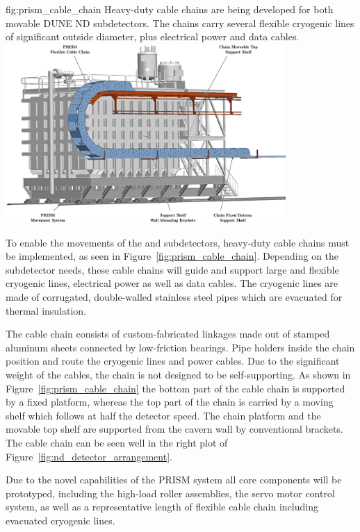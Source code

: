 \begin{dunefigure}{fig:prism_cable_chain}
{Heavy-duty cable chains are being developed for both movable DUNE ND subdetectors. The chains carry several flexible cryogenic lines of significant outside diameter, plus electrical power and data cables.}
\includegraphics[width=0.8\textwidth]{graphics/i-and-i/prism_cable_chain}
\end{dunefigure}

To enable the movements of the  and  subdetectors, heavy-duty cable chains must be implemented, as  seen in Figure~\ref{fig:prism_cable_chain}. Depending on the subdetector needs, these cable chains will guide and support large and flexible cryogenic lines, electrical power as well as data cables. The cryogenic lines are made of corrugated, double-walled stainless steel pipes which are evacuated for thermal insulation.

The cable chain consists of custom-fabricated linkages made out of stamped aluminum sheets connected by low-friction bearings. Pipe holders inside the chain position and route the cryogenic lines and power cables. Due to the significant weight of the cables, the chain is not designed to be self-supporting. As shown in Figure~\ref{fig:prism_cable_chain} the bottom part of the cable chain is supported by a fixed platform, whereas the top part of the chain is carried by a moving shelf which follows at half the detector speed. The chain platform and the movable top shelf are supported from the cavern wall by conventional brackets.  The  cable chain can be seen well in the right plot of Figure~\ref{fig:nd_detector_arrangement}.

Due to the novel capabilities of the PRISM system  all core components will be prototyped, including the high-load  roller assemblies, the servo motor control system, as well as a representative length of flexible cable chain including evacuated cryogenic lines.


